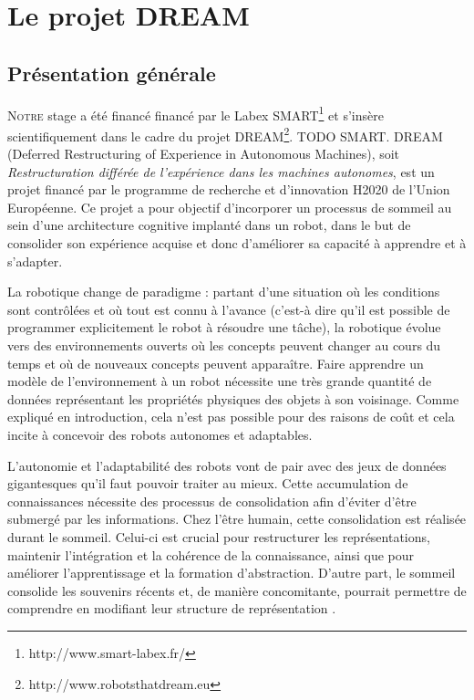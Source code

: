 \documentclass{llncs}
\begin{document}
\section{Le projet DREAM}

\subsection{Présentation générale}

\lettrine{N}{otre} stage a été financé financé par le Labex SMART\footnote{http://www.smart-labex.fr/} et s'insère scientifiquement dans le cadre du projet DREAM\footnote{http://www.robotsthatdream.eu}.
TODO SMART.
DREAM (Deferred Restructuring of Experience in Autonomous Machines), soit \textit{Restructuration différée de l'expérience dans les machines autonomes}, est un projet financé par le programme de recherche et d'innovation H2020 de l'Union Européenne.
Ce projet a pour objectif d'incorporer un processus de sommeil au sein d'une architecture cognitive implanté dans un robot, dans le but de consolider son expérience acquise et donc d'améliorer sa capacité à apprendre et à s'adapter.

La robotique change de paradigme : partant d'une situation où les conditions sont contrôlées et où tout est connu à l'avance (c'est-à dire qu'il est possible de programmer explicitement le robot à résoudre une tâche), la robotique évolue vers des environnements ouverts où les concepts peuvent changer au cours du temps et où de nouveaux concepts peuvent apparaître.
Faire apprendre un modèle de l'environnement à un robot nécessite une très grande quantité de données représentant les propriétés physiques des objets à son voisinage.
Comme expliqué en introduction, cela n'est pas possible pour des raisons de coût et cela incite à concevoir des robots autonomes et adaptables.

L'autonomie et l'adaptabilité des robots vont de pair avec des jeux de données gigantesques qu'il faut pouvoir traiter au mieux.
Cette accumulation de connaissances nécessite des processus de consolidation afin d'éviter d'être submergé par les informations.
Chez l'être humain, cette consolidation est réalisée durant le sommeil.
Celui-ci est crucial pour restructurer les représentations, maintenir l'intégration et la cohérence de la connaissance, ainsi que pour améliorer l'apprentissage et la formation d'abstraction.
D'autre part, le sommeil consolide les souvenirs récents et, de manière concomitante, pourrait permettre de comprendre en modifiant leur structure de représentation \cite{Wagner2004}.
\end{document}
